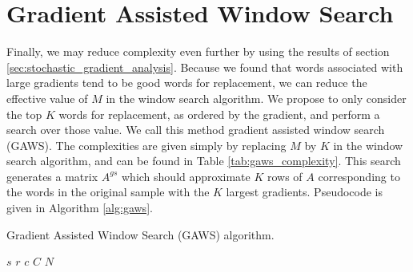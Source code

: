 \section{Gradient Assisted Window Search}
Finally, we may reduce complexity even further by using the results of section \ref{sec:stochastic_gradient_analysis}.  Because we found that words associated with large gradients tend to be good words for replacement, we can reduce the effective value of $M$ in the window search algorithm.  We propose to only consider the top $K$ words for replacement, as ordered by the gradient, and perform a search over those value.  We call this method gradient assisted window search (GAWS).  The complexities are given simply by replacing $M$ by $K$ in the window search algorithm, and can be found in Table \ref{tab:gaws_complexity}.  This search generates a matrix $A^{gs}$ which should approximate $K$ rows of $A$ corresponding to the words in the original sample with the $K$ largest gradients.  Pseudocode is given in Algorithm \ref{alg:gaws}.
\begin{algorithm}
\begin{algorithmic}[1]
\begin{spacing}{1.0}
    \caption{Gradient Assisted Window Search (GAWS) algorithm.}
    \Require $s$ 
    \Require $r$ 
    \Require $c$ 
    \Require $C$ 
    \Require $N$ 
         
    \EndFor
     

         
                \EndIf
            \EndIf
        \EndFor
    \EndFor\\
\label{alg:gaws}
\end{spacing}
\end{algorithmic}
\end{algorithm}

